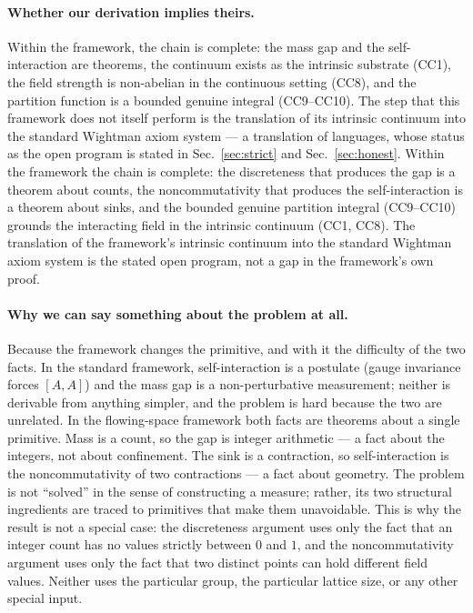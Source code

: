 \documentclass[aps,prd,preprint,superscriptaddress,amsmath,amssymb]{revtex4-2}
\begin{document}
\paragraph{Whether our derivation implies theirs.}
Within the framework, the chain is complete: the mass gap and the
self-interaction are theorems, the continuum exists as the intrinsic
substrate (CC1), the field strength is non-abelian in the continuous
setting (CC8), and the partition function is a bounded genuine
integral (CC9--CC10).  The step that this framework does not itself
perform is the translation of its intrinsic continuum into the
standard Wightman axiom system --- a translation of languages, whose
status as the open program is stated in
Sec.~\ref{sec:strict} and Sec.~\ref{sec:honest}.  Within the
framework the chain is complete: the discreteness that produces the
gap is a theorem about counts, the noncommutativity that produces
the self-interaction is a theorem about sinks, and the bounded
genuine partition integral (CC9--CC10) grounds the interacting field
in the intrinsic continuum (CC1, CC8).  The translation of the
framework's intrinsic continuum into the standard Wightman axiom
system is the stated open program, not a gap in the framework's own
proof.

\paragraph{Why we can say something about the problem at all.}
Because the framework changes the primitive, and with it the
difficulty of the two facts.  In the standard framework,
self-interaction is a postulate (gauge invariance forces $[A,A]$)
and the mass gap is a non-perturbative measurement; neither is
derivable from anything simpler, and the problem is hard because the
two are unrelated.  In the flowing-space framework both facts are
theorems about a single primitive.  Mass is a count, so the gap is
integer arithmetic --- a fact about the integers, not about
confinement.  The sink is a contraction, so self-interaction is the
noncommutativity of two contractions --- a fact about geometry.  The
problem is not ``solved'' in the sense of constructing a measure;
rather, its two structural ingredients are traced to primitives that
make them unavoidable.  This is why the result is not a special
case: the discreteness argument uses only the fact that an integer
count has no values strictly between $0$ and $1$, and the
noncommutativity argument uses only the fact that two distinct
points can hold different field values.  Neither uses the particular
group, the particular lattice size, or any other special input.
\end{document}
